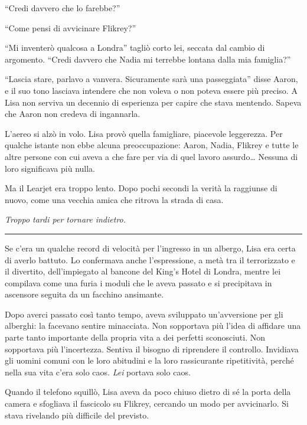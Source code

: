 \documentclass[a4paper,oneside,11pt]{memoir}
\begin{document}
``Credi davvero che lo farebbe?''

``Come pensi di avvicinare Flikrey?''

``Mi inventerò qualcosa a Londra'' tagliò corto lei, seccata dal cambio di
argomento. ``Credi davvero che Nadia mi terrebbe lontana dalla mia famiglia?''

``Lascia stare, parlavo a vanvera. Sicuramente sarà una passeggiata'' disse
Aaron, e il suo tono lasciava intendere che non voleva o non poteva essere più
preciso. A Lisa non serviva un decennio di esperienza per capire che stava
mentendo. Sapeva che Aaron non credeva di ingannarla.

L'aereo si alzò in volo. Lisa provò quella famigliare, piacevole leggerezza. Per
qualche istante non ebbe alcuna preoccupazione: Aaron, Nadia, Flikrey e tutte le
altre persone con cui aveva a che fare per via di quel lavoro assurdo\dots{}
Nessuna di loro significava più nulla.

Ma il Learjet era troppo lento. Dopo pochi secondi la verità la raggiunse di
nuovo, come una vecchia amica che ritrova la strada di casa.

\emph{Troppo tardi per tornare indietro.}

\plainbreak{1}


Se c'era un qualche record di velocità per l'ingresso in un albergo, Lisa era
certa di averlo battuto. Lo confermava anche l'espressione, a metà tra il
terrorizzato e il divertito, dell'impiegato al bancone del King's Hotel di
Londra, mentre lei compilava come una furia i moduli che le aveva passato e si
precipitava in ascensore seguita da un facchino ansimante.

Dopo averci passato così tanto tempo, aveva sviluppato un'avversione per gli
alberghi: la facevano sentire minacciata. Non sopportava più l'idea di affidare
una parte tanto importante della propria vita a dei perfetti sconosciuti. Non
sopportava più l'incertezza. Sentiva il bisogno di riprendere il controllo.
Invidiava gli uomini comuni con le loro abitudini e la loro rassicurante
ripetitività, perché nella sua vita c'era solo caos. \emph{Lei} portava solo
caos.


Quando il telefono squillò, Lisa aveva da poco chiuso dietro di sé la porta
della camera e sfogliava il fascicolo su Flikrey, cercando un modo per
avvicinarlo. Si stava rivelando più difficile del previsto.
\end{document}
